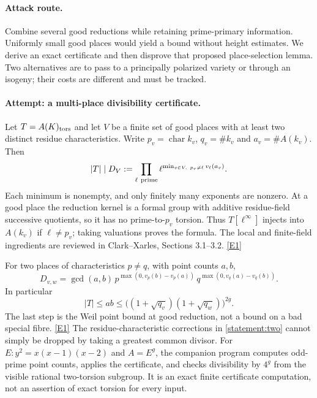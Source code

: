 \documentclass[11pt,a4paper]{article}
\newcommand{\eref}[2]{\hyperlink{extra:#1:#2}{[E#2]}}
\numberwithin{equation}{section}
\begin{document}
\paragraph{Attack route.}
Combine several good reductions while retaining prime-primary information.
Uniformly small good places would yield a bound without height estimates.
We derive an exact certificate and then disprove that proposed place-selection
lemma. Two alternatives are to pass to a principally polarized variety or
through an isogeny; their costs are different and must be tracked.

\paragraph{Attempt: a multi-place divisibility certificate.}
Let $T=A(K)_{\rm tors}$ and let $V$ be a finite set of good places with at
least two distinct residue characteristics. Write $p_v=\operatorname{char}k_v$,
$q_v=\#k_v$ and $a_v=\#A(k_v)$. Then
\begin{equation}\label{statement:certificate}
 |T|\mid D_V:=\prod_{\ell\ {\rm prime}}
       \ell^{\min_{v\in V,\ p_v\ne\ell}v_\ell(a_v)}.
\end{equation}
Each minimum is nonempty, and only finitely many exponents are nonzero.
At a good place the reduction kernel is a formal group with additive
residue-field successive quotients, so it has no prime-to-$p_v$ torsion.
Thus $T[\ell^\infty]$ injects into $A(k_v)$ if $\ell\ne p_v$; taking
valuations proves the formula. The local and finite-field ingredients are
reviewed in Clark--Xarles, Sections 3.1--3.2. \eref{statement}{1}

For two places of characteristics $p\ne q$, with point counts $a,b$,
\begin{equation}\label{statement:two}
 D_{v,w}=\gcd(a,b)\,
 p^{\max(0,v_p(b)-v_p(a))}\,
 q^{\max(0,v_q(a)-v_q(b))}.
\end{equation}
In particular
\[
 |T|\le ab\le\bigl((1+\sqrt{q_v})(1+\sqrt{q_w})\bigr)^{2g}.
\]
The last step is the Weil point bound at good reduction, not a bound on a
bad special fibre. \eref{statement}{1} The residue-characteristic corrections in
\eqref{statement:two} cannot simply be dropped by taking a greatest common divisor.
For $E:y^2=x(x-1)(x-2)$ and $A=E^g$, the companion program computes odd-prime
point counts, applies the certificate, and checks divisibility by $4^g$
from the visible rational two-torsion subgroup. It is an exact finite
certificate computation, not an assertion of exact torsion for every input.
\end{document}
